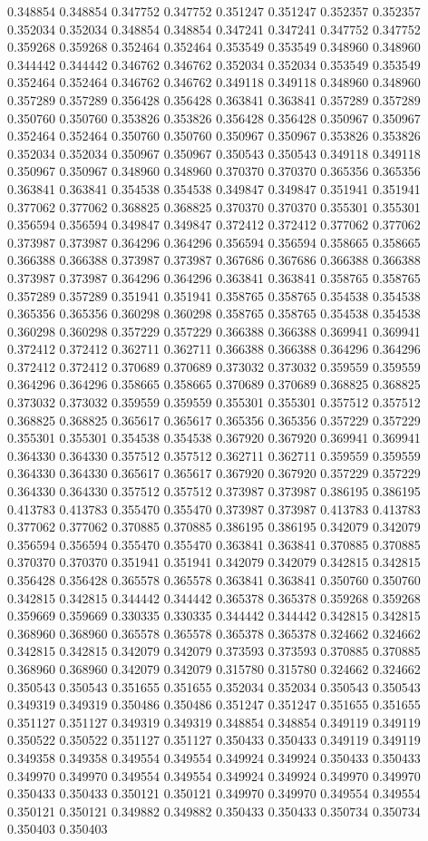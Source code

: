 0.348854 0.348854 0.347752 0.347752 0.351247 0.351247 0.352357 0.352357 0.352034 0.352034 0.348854 0.348854 0.347241 0.347241 0.347752 0.347752 0.359268 0.359268 0.352464 0.352464 0.353549 0.353549 0.348960 0.348960 0.344442 0.344442 0.346762 0.346762 0.352034 0.352034 0.353549 0.353549 0.352464 0.352464 0.346762 0.346762 0.349118 0.349118 0.348960 0.348960 0.357289 0.357289 0.356428 0.356428 0.363841 0.363841 0.357289 0.357289 0.350760 0.350760 0.353826 0.353826 0.356428 0.356428 0.350967 0.350967 0.352464 0.352464 0.350760 0.350760 0.350967 0.350967 0.353826 0.353826 0.352034 0.352034 0.350967 0.350967 0.350543 0.350543 0.349118 0.349118 0.350967 0.350967 0.348960 0.348960 0.370370 0.370370 0.365356 0.365356 0.363841 0.363841 0.354538 0.354538 0.349847 0.349847 0.351941 0.351941 0.377062 0.377062 0.368825 0.368825 0.370370 0.370370 0.355301 0.355301 0.356594 0.356594 0.349847 0.349847 0.372412 0.372412 0.377062 0.377062 0.373987 0.373987 0.364296 0.364296 0.356594 0.356594 0.358665 0.358665 0.366388 0.366388 0.373987 0.373987 0.367686 0.367686 0.366388 0.366388 0.373987 0.373987 0.364296 0.364296 0.363841 0.363841 0.358765 0.358765 0.357289 0.357289 0.351941 0.351941 0.358765 0.358765 0.354538 0.354538 0.365356 0.365356 0.360298 0.360298 0.358765 0.358765 0.354538 0.354538 0.360298 0.360298 0.357229 0.357229 0.366388 0.366388 0.369941 0.369941 0.372412 0.372412 0.362711 0.362711 0.366388 0.366388 0.364296 0.364296 0.372412 0.372412 0.370689 0.370689 0.373032 0.373032 0.359559 0.359559 0.364296 0.364296 0.358665 0.358665 0.370689 0.370689 0.368825 0.368825 0.373032 0.373032 0.359559 0.359559 0.355301 0.355301 0.357512 0.357512 0.368825 0.368825 0.365617 0.365617 0.365356 0.365356 0.357229 0.357229 0.355301 0.355301 0.354538 0.354538 0.367920 0.367920 0.369941 0.369941 0.364330 0.364330 0.357512 0.357512 0.362711 0.362711 0.359559 0.359559 0.364330 0.364330 0.365617 0.365617 0.367920 0.367920 0.357229 0.357229 0.364330 0.364330 0.357512 0.357512 0.373987 0.373987 0.386195 0.386195 0.413783 0.413783 0.355470 0.355470 0.373987 0.373987 0.413783 0.413783 0.377062 0.377062 0.370885 0.370885 0.386195 0.386195 0.342079 0.342079 0.356594 0.356594 0.355470 0.355470 0.363841 0.363841 0.370885 0.370885 0.370370 0.370370 0.351941 0.351941 0.342079 0.342079 0.342815 0.342815 0.356428 0.356428 0.365578 0.365578 0.363841 0.363841 0.350760 0.350760 0.342815 0.342815 0.344442 0.344442 0.365378 0.365378 0.359268 0.359268 0.359669 0.359669 0.330335 0.330335 0.344442 0.344442 0.342815 0.342815 0.368960 0.368960 0.365578 0.365578 0.365378 0.365378 0.324662 0.324662 0.342815 0.342815 0.342079 0.342079 0.373593 0.373593 0.370885 0.370885 0.368960 0.368960 0.342079 0.342079 0.315780 0.315780 0.324662 0.324662 0.350543 0.350543 0.351655 0.351655 0.352034 0.352034 0.350543 0.350543 0.349319 0.349319 0.350486 0.350486 0.351247 0.351247 0.351655 0.351655 0.351127 0.351127 0.349319 0.349319 0.348854 0.348854 0.349119 0.349119 0.350522 0.350522 0.351127 0.351127 0.350433 0.350433 0.349119 0.349119 0.349358 0.349358 0.349554 0.349554 0.349924 0.349924 0.350433 0.350433 0.349970 0.349970 0.349554 0.349554 0.349924 0.349924 0.349970 0.349970 0.350433 0.350433 0.350121 0.350121 0.349970 0.349970 0.349554 0.349554 0.350121 0.350121 0.349882 0.349882 0.350433 0.350433 0.350734 0.350734 0.350403 0.350403 